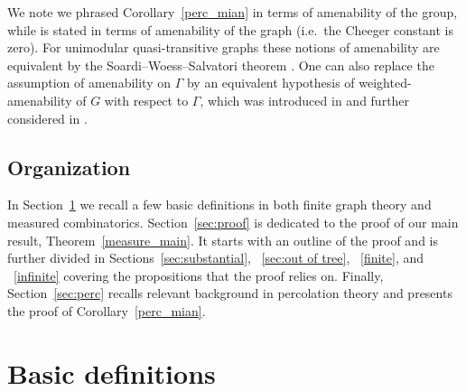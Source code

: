 \documentclass[letterpaper,11pt,reqno]{amsart}
\theoremstyle{bfnote}
\theoremstyle{definition}
\newcommand{\0}{\varnothing}
\newcommand{\red}[1]{{\color{red}#1}}
\newcommand{\todo}[1]{\red{\textbf{\upshape{[#1]}}}}
\numberwithin{equation}{section}
\begin{document}
We note we phrased Corollary~\ref{perc_mian} in terms of amenability of the group, while \cite[Corollary 1.2]{Timar_oneended} is stated in terms of amenability of the graph (i.e.\ the Cheeger constant is zero). For unimodular quasi-transitive graphs these notions of amenability are equivalent by the Soardi--Woess--Salvatori theorem \cite{Soardi-Woess,Salvatori}. One can also replace the assumption of amenability on $\Gamma$ by an equivalent hypothesis of weighted-amenability of $G$ with respect to $\Gamma$, which was introduced in \cite{BLPS99inv} and further considered in \cite{wamen}.

\subsection*{Organization}
In Section~\ref{basic_def} we recall a few basic definitions in both finite graph theory and measured combinatorics. Section~\ref{sec:proof} is dedicated to the proof of our main result, Theorem~\ref{measure_main}. It starts with an outline of the proof and is further divided in  Sections~\ref{sec:substantial}, ~\ref{sec:out of tree}, ~\ref{finite}, and ~\ref{infinite} covering the propositions that the proof relies on. Finally, Section~\ref{sec:perc} recalls relevant background in percolation theory and presents the proof of Corollary~\ref{perc_mian}.

\section{Basic definitions}\label{basic_def}



\end{document}
